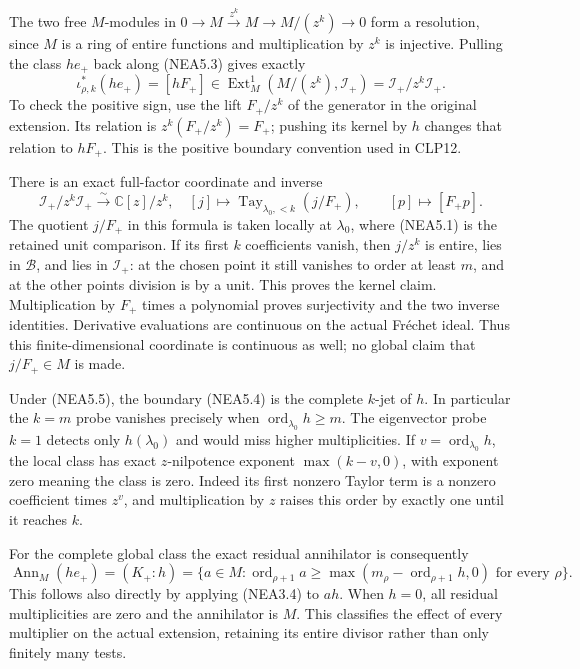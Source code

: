 The two free \(M\)-modules in
\(0\to M\xrightarrow{z^k}M\to M/(z^k)\to0\) form a resolution, since
\(M\) is a ring of entire functions and multiplication by \(z^k\) is
injective. Pulling the class \(h e_+\) back along (NEA5.3) gives exactly
\[
\iota_{\rho,k}^*(h e_+)=[hF_+]
\in\operatorname{Ext}^1_M(M/(z^k),\mathcal I_+)
=\mathcal I_+/z^k\mathcal I_+.
\tag{NEA5.4}
\] To check the positive sign, use the lift \(F_+/z^k\) of the generator
in the original extension. Its relation is \(z^k(F_+/z^k)=F_+\); pushing
its kernel by \(h\) changes that relation to \(hF_+\). This is the
positive boundary convention used in CLP12.

There is an exact full-factor coordinate and inverse \[
\mathcal I_+/z^k\mathcal I_+\xrightarrow{\sim}\mathbb C[z]/z^k,
\quad [j]\longmapsto\operatorname{Tay}_{\lambda_0,<k}(j/F_+),
\qquad [p]\longmapsto[F_+p].
\tag{NEA5.5}
\] The quotient \(j/F_+\) in this formula is taken locally at
\(\lambda_0\), where (NEA5.1) is the retained unit comparison. If its
first \(k\) coefficients vanish, then \(j/z^k\) is entire, lies in
\(\mathcal B\), and lies in \(\mathcal I_+\): at the chosen point it
still vanishes to order at least \(m\), and at the other points division
is by a unit. This proves the kernel claim. Multiplication by \(F_+\)
times a polynomial proves surjectivity and the two inverse identities.
Derivative evaluations are continuous on the actual Fréchet ideal. Thus
this finite-dimensional coordinate is continuous as well; no global
claim that \(j/F_+\in M\) is made.

Under (NEA5.5), the boundary (NEA5.4) is the complete \(k\)-jet of
\(h\). In particular the \(k=m\) probe vanishes precisely when
\(\operatorname{ord}_{\lambda_0}h\ge m\). The eigenvector probe \(k=1\)
detects only \(h(\lambda_0)\) and would miss higher multiplicities. If
\(v=\operatorname{ord}_{\lambda_0}h\), the local class has exact
\(z\)-nilpotence exponent \(\max(k-v,0)\), with exponent zero meaning
the class is zero. Indeed its first nonzero Taylor term is a nonzero
coefficient times \(z^v\), and multiplication by \(z\) raises this order
by exactly one until it reaches \(k\).

For the complete global class the exact residual annihilator is
consequently \[
\operatorname{Ann}_M(h e_+)=(K_+:h)
=\{a\in M:\operatorname{ord}_{\rho+1}a\ge
\max(m_\rho-\operatorname{ord}_{\rho+1}h,0)\text{ for every }\rho\}.
\tag{NEA5.6}
\] This follows also directly by applying (NEA3.4) to \(ah\). When
\(h=0\), all residual multiplicities are zero and the annihilator is
\(M\). This classifies the effect of every multiplier on the actual
extension, retaining its entire divisor rather than only finitely many
tests.

